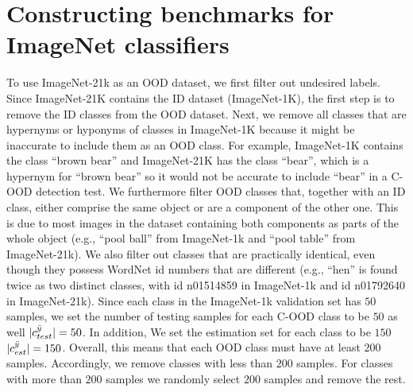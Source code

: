 \documentclass[table]{article} \usepackage{PRIMEarxiv}
\begin{document}
\section{Constructing benchmarks for ImageNet classifiers}
\label{sec:imagenet_benchmark}
To use ImageNet-21k as an OOD dataset, we first filter out undesired labels.
Since ImageNet-21K contains the ID dataset (ImageNet-1K), the first step is to remove the ID classes from the OOD dataset. Next, we remove all classes that are hypernyms or hyponyms of classes in ImageNet-1K because it might be inaccurate to include them as an OOD class. For example, ImageNet-1K contains the class ``brown bear'' and ImageNet-21K has the class ``bear'', which is a hypernym for ``brown bear'' so it would not be accurate to include ``bear'' in a C-OOD detection test. 
We furthermore filter OOD classes that, together with an ID class, either comprise the same object or are a component of the other one. This is due to most images in the dataset containing both components as parts of the whole object (e.g., ``pool ball'' from ImageNet-1k and ``pool table'' from ImageNet-21k).
We also filter out classes that are practically identical, even though they possess WordNet id numbers that are different (e.g., ``hen'' is found twice as two distinct classes, with id n01514859 in ImageNet-1k and id n01792640 in ImageNet-21k).
Since each class in the ImageNet-1k validation set has $50$ samples, we set the number of testing samples for each C-OOD class to be $50$ as well $|c_{test}^{\Bar{y}}|=50$. In addition, We set the estimation set for each class to be $150$ $|c_{est}^{\Bar{y}}|=150$. Overall, this means that each OOD class must have at least $200$ samples. 
Accordingly, we remove classes with less than $200$ samples. For classes with more than $200$ samples we randomly select $200$ samples and remove the rest.
\end{document}
